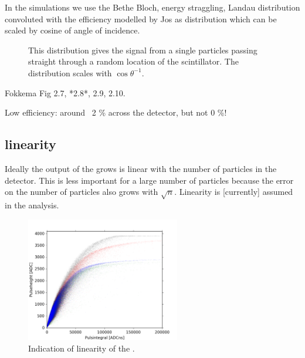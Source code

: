 In the simulations we use the Bethe Bloch, energy straggling, Landau
distribution convoluted with the efficiency modelled by Jos as
distribution which can be scaled by cosine of angle of incidence.

\begin{figure}
    \centering
    
    \caption{ This distribution gives
             the signal from a single particles passing straight through
             a random location of the scintillator. The distribution
             scales with $\cos{\theta}^{-1}$.}
    \label{fig:signal_efficiency}
\end{figure}

Fokkema Fig 2.7, *2.8*, 2.9, 2.10.

Low efficiency: around ~2 \% across the detector, but not 0 \%!


\subsection{\pmt linearity}

Ideally the output of the \pmt grows is linear with the number of
particles in the detector. This is less important for a large number of
particles because the error on the number of particles also grows with
$\sqrt{n}$. Linearity is [currently] assumed in the analysis.

\begin{figure}
    \centering
    \includegraphics[width=0.6\textwidth]{plots/response/ph_vs_pi.png}
    \caption{
             Indication of linearity of the \pmt.}
    \label{fig:transport_time}
\end{figure}


\subsection{\adcs}


